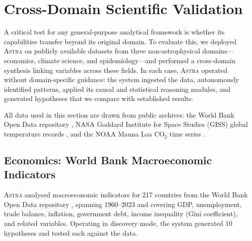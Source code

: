 \documentclass[usenatbib]{rasti}
\newcommand{\astra}{\textsc{Astra}\xspace}
\begin{document}
\section{Cross-Domain Scientific Validation}
\label{sec:crossdomain}

A critical test for any general-purpose analytical framework is whether its capabilities transfer beyond its original domain.
To evaluate this, we deployed \astra on publicly available datasets from three non-astrophysical domains---economics, climate science, and epidemiology---and performed a cross-domain synthesis linking variables across these fields.
In each case, \astra operated without domain-specific guidance: the system ingested the data, autonomously identified patterns, applied its causal and statistical reasoning modules, and generated hypotheses that we compare with established results.

All data used in this section are drawn from public archives: the World Bank Open Data repository \citep{WorldBank2024}, NASA Goddard Institute for Space Studies (GISS) global temperature records \citep{Hansen2010}, and the NOAA Mauna Loa CO$_{2}$ time series \citep{NOAA2024}.

\subsection{Economics: World Bank Macroeconomic Indicators}
\label{sec:crossdomain:economics}

\astra analysed macroeconomic indicators for 217 countries from the World Bank Open Data repository \citep{WorldBank2024}, spanning 1960--2023 and covering GDP, unemployment, trade balance, inflation, government debt, income inequality (Gini coefficient), and related variables.
Operating in discovery mode, the system generated 10 hypotheses and tested each against the data.
\end{document}

